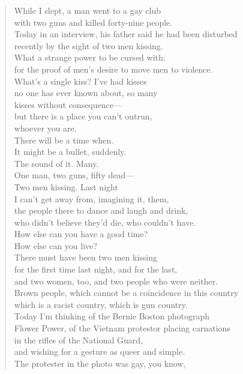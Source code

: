 \documentclass[12pt, openany, letterpaper]{memoir}
\begin{document}
\begin{verse}
	While I slept, a man went to a gay club\\
	with two guns and killed forty-nine people.\\
	Today in an interview, his father said he had been disturbed\\
	recently by the sight of two men kissing.\\
	What a strange power to be cursed with:\\
	for the proof of men's desire to move men to violence.\\
	What's a single kiss? I've had kisses\\
	no one has ever known about, so many\\
	kisses without consequence—\\
	but there is a place you can't outrun,\\
	whoever you are.\\
	There will be a time when.\\
	It might be a bullet, suddenly.\\
	The sound of it. Many.\\
	One man, two guns, fifty dead—\\
	Two men kissing. Last night\\
	I can't get away from, imagining it, them,\\
	the people there to dance and laugh and drink,\\
	who didn't believe they'd die, who couldn't have.\\
	How else can you have a good time?\\
	How else can you live?\\
	There must have been two men kissing\\
	for the first time last night, and for the last,\\
	and two women, too, and two people who were neither.\\
	Brown people, which cannot be a coincidence in this country\\
	which is a racist country, which is gun country.\\
	Today I'm thinking of the Bernie Boston photograph\\
	Flower Power, of the Vietnam protestor placing carnations\\
	in the rifles of the National Guard,\\
	and wishing for a gesture as queer and simple.\\
	The protester in the photo was gay, you know,\\

\end{verse}
\end{document}
